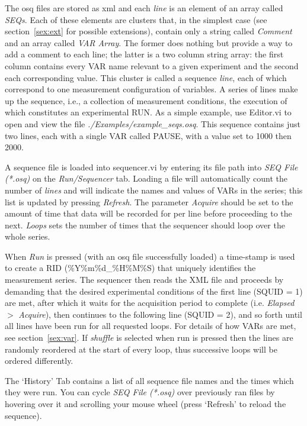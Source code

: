 \documentclass[10pt,a4paper]{article}
\begin{document}
The osq files are stored as xml and each \emph{line} is an element of an array called \emph{SEQs}.  Each of these elements are clusters that, in the simplest case (see section~\ref{sex:ext} for possible extensions), contain only a string called \emph{Comment} and an array called \emph{VAR Array}. The former does nothing but provide a way to add a comment to each line; the latter is a two column string array: the first column contains every VAR name relevant to a given experiment and the second each corresponding value.  This cluster is called  a sequence \emph{line}, each of which correspond to one measurement configuration of variables.  A series of lines make up the sequence, i.e., a collection of measurement conditions, the execution of which constitutes an experimental RUN.  As a simple example, use Editor.vi to open and view the file \emph{./Examples/example\_seqs.osq}.  This sequence contains just two lines, each with a single VAR called PAUSE, with a value set to 1000 then 2000.

A sequence file is loaded into sequencer.vi by entering its file path into  \emph{SEQ File (*.osq)} on the \emph{Run/Sequencer} tab.  Loading a file will automatically count the number of \emph{lines} and will indicate the names and values of VARs in the series; this list is updated by pressing \emph{Refresh}.  The parameter \emph{Acquire} should be set to the amount of time that data will be recorded for per line before proceeding to the next. \emph{Loops} sets the number of times that the sequencer should loop over the whole series. 

When \emph{Run} is pressed (with an osq file successfully loaded) a time-stamp is used to create a RID (\%Y\%m\%d\_\%H\%M\%S) that uniquely identifies the measurement series. The sequencer then reads the XML file and proceeds by demanding that the desired experimental conditions of the first line (SQUID = 1) are met, after which it waits for the acquisition period to complete (i.e. \emph{Elapsed} $>$ \emph{Acquire}), then continues to the following line (SQUID = 2), and so forth until all lines have been run for all requested loops.  For details of how VARs are met, see section~\ref{sex:var}.  If \emph{shuffle} is selected when run is pressed then the lines are randomly reordered at the start of every loop, thus successive loops will be ordered differently.

The `History' Tab contains a list of all sequence file names and the times which they were run.  You can cycle \emph{SEQ File (*.osq)} over previously ran files by hovering over it and scrolling your mouse wheel (press `Refresh' to reload the sequence).
\end{document}
